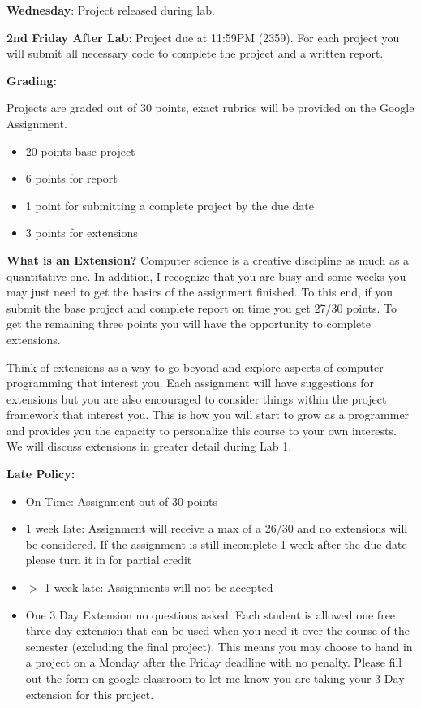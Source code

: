 \documentclass[12pt]{article}
\begin{document}
\textbf{Wednesday}: Project released during lab.

\textbf{2nd Friday After Lab}: Project due at 11:59PM (2359). For each project you will submit all necessary code to complete the project and a written report. 

\textbf{Grading:}

Projects are graded out of 30 points, exact rubrics will be provided on the Google Assignment. 
\begin{itemize}
\item 20 points base project
\item 6 points for report
\item 1 point for submitting a complete project by the due date
\item 3 points for extensions  
\end{itemize}

\textbf{What is an Extension?}
Computer science is a creative discipline as much as a quantitative one.
In addition, I recognize that you are busy and some weeks you may just need to get the basics of the assignment finished.
To this end, if you submit the base project and complete report on time you get 27/30 points.
To get the remaining three points you will have the opportunity to complete extensions.

Think of extensions as a way to go beyond and explore aspects of computer programming that interest you.
Each assignment will have suggestions for extensions but you are also encouraged to consider things within the project framework that interest you.
This is how you will start to grow as a programmer and provides you the capacity to personalize this course to your own interests. 
We will discuss extensions in greater detail during Lab 1. 

\textbf{Late Policy:}
\begin{itemize}
\item On Time: Assignment out of 30 points
\item 1 week late: Assignment will receive a max of a 26/30 and no extensions will be considered. If the assignment is still incomplete 1 week after the due date please turn it in for partial credit
\item $>$ 1 week late: Assignments will not be accepted
\item One 3 Day Extension no questions asked: Each student is allowed one free three-day extension that can be used when you need it over the course of the semester (excluding the final project). This means you may choose to hand in a project on a Monday after the Friday deadline with no penalty. Please fill out the form on google classroom to let me know you are taking your 3-Day extension for this project.
\end{itemize}
\end{document}
